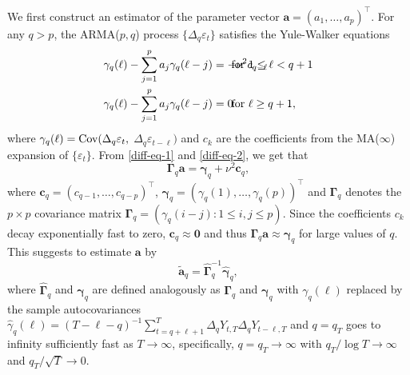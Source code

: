 We first construct an estimator of the parameter vector $\boldsymbol{a} = (a_1,\ldots,a_p)^\top$. For any $q > p$, the ARMA($p,q$) process $\{ \Delta_q \varepsilon_t \}$ satisfies the Yule-Walker equations
\begin{align}
\gamma_q(\ell) - \sum\limits_{j=1}^p a_j \gamma_q(\ell-j) & = -\nu^2 c_{q-\ell} \hspace{-1.5cm} & & \text{for } 1 \le \ell < q+1 \label{diff-eq-1} \\
\gamma_q(\ell) - \sum\limits_{j=1}^p a_j \gamma_q(\ell-j) & = 0 \hspace{-1.5cm} & & \text{for } \ell \ge q+1, \label{diff-eq-2}  
\end{align}
where $\gamma_q(\ell) = \textnormal{Cov}(\Delta_q \varepsilon_t,$ $\Delta_q \varepsilon_{t-\ell})$ and $c_k$ are the coefficients from the MA($\infty$) expansion of $\{ \varepsilon_t \}$. From \eqref{diff-eq-1} and \eqref{diff-eq-2}, we get that 
\begin{equation}\label{YW-eq} 
\boldsymbol{\Gamma}_q \boldsymbol{a} = \boldsymbol{\gamma}_q + \nu^2 \boldsymbol{c}_q,  
\end{equation} 
where $\boldsymbol{c}_q = (c_{q-1},\dots,c_{q-p})^\top$, $\boldsymbol{\gamma}_q = (\gamma_q(1),\dots,\gamma_q(p))^\top$ and $\boldsymbol{\Gamma}_q$ denotes the $p \times p$ covariance matrix $\boldsymbol{\Gamma}_q = (\gamma_q(i-j): 1 \le i,j \le p)$. Since the coefficients $c_k$ decay exponentially fast to zero, $\boldsymbol{c}_q \approx \boldsymbol{0}$ and thus $\boldsymbol{\Gamma}_q \boldsymbol{a} \approx \boldsymbol{\gamma}_q$ for large values of $q$. This suggests to estimate $\boldsymbol{a}$ by 
\begin{equation}\label{est-AR-FS}
\widetilde{\boldsymbol{a}}_q = \widehat{\boldsymbol{\Gamma}}_q^{-1} \widehat{\boldsymbol{\gamma}}_q, 
\end{equation}
where $\widehat{\boldsymbol{\Gamma}}_q$ and $\widehat{\boldsymbol{\gamma}}_q$ are defined analogously as $\boldsymbol{\Gamma}_q$ and $\boldsymbol{\gamma}_q$ with $\gamma_q(\ell)$ replaced by the sample autocovariances $\widehat{\gamma}_q(\ell) = (T-\ell-q)^{-1} \sum_{t=q+\ell+1}^T \Delta_q Y_{t,T} \Delta_q Y_{t-\ell,T}$ and $q = q_T$ goes to infinity sufficiently fast as $T \rightarrow \infty$, specifically, $q = q_T \rightarrow \infty$ with $q_T / \log T \rightarrow \infty$ and $q_T/\sqrt{T} \rightarrow 0$. 



